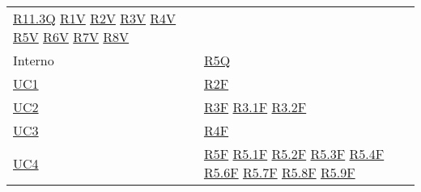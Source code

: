 \begin{center}
\begin{longtable}[!h]{m{50px} m{50px}}
        \newline \hyperref[tab:RequisitiQualita]{R11.3Q}
        \newline \hyperref[tab:RequisitiVincolo]{R1V}
        \newline \hyperref[tab:RequisitiVincolo]{R2V}
        \newline \hyperref[tab:RequisitiVincolo]{R3V}
        \newline \hyperref[tab:RequisitiVincolo]{R4V}
        \newline \hyperref[tab:RequisitiVincolo]{R5V}
        \newline \hyperref[tab:RequisitiVincolo]{R6V}
        \newline \hyperref[tab:RequisitiVincolo]{R7V}
        \newline \hyperref[tab:RequisitiVincolo]{R8V}                                   \\


        Interno                           &                                             %
        \hyperref[tab:RequisitiQualita]{R5Q}                                            \\

        \hyperref[sec:UC1]{UC1}           & \hyperref[tab:RequisitiFunzionali]{R2F}     \\

        \hyperref[sec:UC2]{UC2}           & \hyperref[tab:RequisitiFunzionali]{R3F}
        \newline \hyperref[tab:RequisitiFunzionali]{R3.1F}
        \newline \hyperref[tab:RequisitiFunzionali]{R3.2F}                              \\

        \hyperref[sec:UC3]{UC3}           & \hyperref[tab:RequisitiFunzionali]{R4F}     \\

        \hyperref[sec:UC4]{UC4}           & \hyperref[tab:RequisitiFunzionali]{R5F}
        \newline \hyperref[tab:RequisitiFunzionali]{R5.1F}
        \newline \hyperref[tab:RequisitiFunzionali]{R5.2F}
        \newline \hyperref[tab:RequisitiFunzionali]{R5.3F}
        \newline \hyperref[tab:RequisitiFunzionali]{R5.4F}
        \newline \hyperref[tab:RequisitiFunzionali]{R5.6F}
        \newline \hyperref[tab:RequisitiFunzionali]{R5.7F}
        \newline \hyperref[tab:RequisitiFunzionali]{R5.8F}
        \newline \hyperref[tab:RequisitiFunzionali]{R5.9F}                              \\


\end{longtable}
\end{center}
